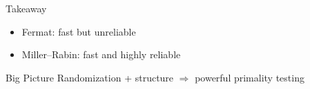 \documentclass{beamer}
\begin{document}

\begin{frame}{Takeaway}

\begin{itemize}
    \item Fermat: fast but unreliable
    \item Miller--Rabin: fast and highly reliable
\end{itemize}

\vspace{1em}

\begin{block}{Big Picture}
Randomization + structure $\Rightarrow$ powerful primality testing
\end{block}

\end{frame}
\end{document}
